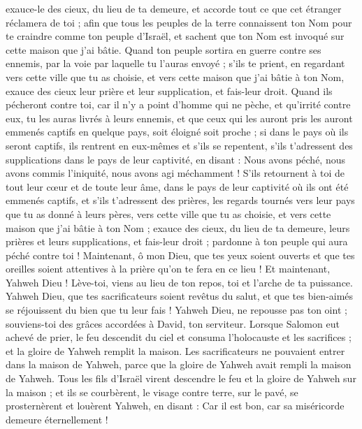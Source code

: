\begin{multicols}{2}
exauce-le des cieux, du lieu de ta demeure, et accorde tout ce que cet étranger réclamera de toi ; afin que tous les peuples de la terre connaissent ton Nom pour te craindre comme ton peuple d'Israël, et sachent que ton Nom est invoqué sur cette maison que j'ai bâtie.
Quand ton peuple sortira en guerre contre ses ennemis, par la voie par laquelle tu l'auras envoyé ; s'ils te prient, en regardant vers cette ville que tu as choisie, et vers cette maison que j'ai bâtie à ton Nom,
exauce des cieux leur prière et leur supplication, et fais-leur droit.
Quand ils pécheront contre toi, car il n'y a point d'homme qui ne pèche, et qu'irrité contre eux, tu les auras livrés à leurs ennemis, et que ceux qui les auront pris les auront emmenés captifs en quelque pays, soit éloigné soit proche ;
si dans le pays où ils seront captifs, ils rentrent en eux-mêmes et s'ils se repentent, s'ils t'adressent des supplications dans le pays de leur captivité, en disant : Nous avons péché, nous avons commis l'iniquité, nous avons agi méchamment !
S'ils retournent à toi de tout leur cœur et de toute leur âme, dans le pays de leur captivité où ils ont été emmenés captifs, et s'ils t'adressent des prières, les regards tournés vers leur pays que tu as donné à leurs pères, vers cette ville que tu as choisie, et vers cette maison que j'ai bâtie à ton Nom ;
exauce des cieux, du lieu de ta demeure, leurs prières et leurs supplications, et fais-leur droit ; pardonne à ton peuple qui aura péché contre toi !
Maintenant, ô mon Dieu, que tes yeux soient ouverts et que tes oreilles soient attentives à la prière qu'on te fera en ce lieu !
Et maintenant, Yahweh Dieu ! Lève-toi, viens au lieu de ton repos, toi et l'arche de ta puissance. Yahweh Dieu, que tes sacrificateurs soient revêtus du salut, et que tes bien-aimés se réjouissent du bien que tu leur fais !
Yahweh Dieu, ne repousse pas ton oint ; souviens-toi des grâces accordées à David, ton serviteur.
\VerseOne{}Lorsque Salomon eut achevé de prier, le feu descendit du ciel et consuma l'holocauste et les sacrifices ; et la gloire de Yahweh remplit la maison.
Les sacrificateurs ne pouvaient entrer dans la maison de Yahweh, parce que la gloire de Yahweh avait rempli la maison de Yahweh.
Tous les fils d'Israël virent descendre le feu et la gloire de Yahweh sur la maison ; et ils se courbèrent, le visage contre terre, sur le pavé, se prosternèrent et louèrent Yahweh, en disant : Car il est bon, car sa miséricorde demeure éternellement !

\end{multicols}
